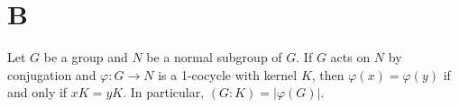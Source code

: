 %
%
%
%
%
%
%

\section*{B}

\begin{lemma}
	\label{lem:1cocycle}
	Let $G$ be a group and $N$ be a normal subgroup of $G$. If $G$ acts on $N$ by conjugation and  
	$\varphi\colon G\to N$ is a 1-cocycle with kernel $K$, then 
	$\varphi(x)=\varphi(y)$ if and only if $xK=yK$. In particular,
	$(G:K)=|\varphi(G)|$. 
\end{lemma}

